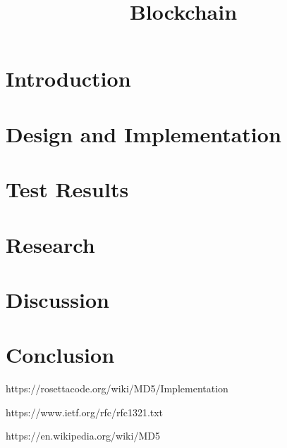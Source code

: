 \documentclass{article}
\title{\textbf{Blockchain}}
\author{}
\date{}
\begin{document}
\maketitle \thispagestyle{fancy}

\begin{abstract}
    
\end{abstract}

\section{Introduction}
 
\section{Design and Implementation}

\section{Test Results}

\section{Research}

\section{Discussion}

\section{Conclusion}


\bigskip





https://rosettacode.org/wiki/MD5/Implementation

https://www.ietf.org/rfc/rfc1321.txt  

https://en.wikipedia.org/wiki/MD5  
\end{document}
